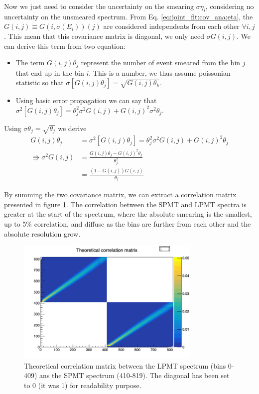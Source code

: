 \documentclass[../main.tex]{subfiles}
\begin{document}
Now we just need to consider the uncertainty on the smearing $\sigma \eta_i$, considering no uncertainty on the unsmeared spectrum. From Eq. \ref{eq:joint_fit:cov_ana:eta}, the $G(i, j) \equiv G(i, \sigma(E_i))(j)$ are considered independents from each other $\forall i, j$. This mean that this covariance matrix is diagonal, we only need $\sigma G(i, j)$. We can derive this term from two equation:
\begin{itemize}
  \item The term $G(i, j)\theta_j$ represent the number of event smeared from the bin $j$ that end up in the bin $i$. This is a number, we thus assume poissonian statistic so that $\sigma[G(i, j)\theta_j] = \sqrt{G(i, j) \theta_k}$.
  \item Using basic error propagation we can say that $\sigma^2[G(i, j)\theta_j] =\theta_j^2 \sigma^2G(i, j) + G(i, j)^2 \sigma^2 \theta_j$.
\end{itemize}
Using $\sigma\theta_j = \sqrt{\theta_j}$ we derive
\begin{align}
  G(i, j) \theta_j &= \sigma^2[G(i, j)\theta_j] =\theta_j^2 \sigma^2G(i, j) + G(i, j)^2 \theta_j \\
  \Rrightarrow \sigma^2 G(i, j) &= \frac{G(i, j) \theta_j - G(i, j)^2 \theta_j}{\theta_j^2} \\
                                &= \frac{(1 - G(i, j))G(i, j)}{\theta_j}
\end{align}

By summing the two covariance matrix, we can extract a correlation matrix presented in figure \ref{fig:joint_fit:th_cor_mat}. The correlation between the SPMT and LPMT spectra is greater at the start of the spectrum, where the absolute smearing is the smallest, up to 5\% correlation, and diffuse as the bins are further from each other and the absolute resolution grow.

\begin{figure}[ht]
  \centering
  \includegraphics[height=6cm]{images/joint_fit/theoretical_corr.png}
  \caption{Theoretical correlation matrix between the LPMT spectrum (bins 0-409) ans the SPMT spectrum (410-819). The diagonal has been set to 0 (it was 1) for readability purpose.}
  \label{fig:joint_fit:th_cor_mat}
\end{figure}
\end{document}
